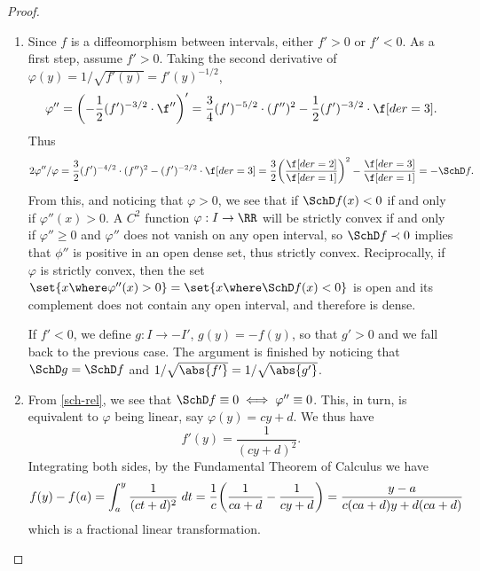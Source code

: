 \documentclass[../main]{subfiles}
\begin{document}
\begin{proof}
\begin{enumerate}
    \begin{equation*}
      0 = \SchD{\Id} = (\SchD f^{-1}) \circ f \cdot (f')^2 + \SchD f,
    \end{equation*}
    and by the same argument of the paragraph above, we conclude \(\SchD f \prec 0 \iff \SchD f^{-1} \succ 0\).
    \item Since \(f\) is a diffeomorphism between intervals, either \(f' > 0\) or \(f' < 0\). As a first step, assume \(f' > 0\). Taking the second derivative of \(\varphi(y) = 1/ \sqrt{f'(y)} = f'(y)^{-1/2}\),
    \begin{equation*}
      \varphi'' = \rpar*{-\frac{1}{2}\rpar{f'}^{-3/2}\cdot{\f''}}' =
      \frac{3}{4}(f')^{-5/2}\cdot (f'')^2 - \frac{1}{2}(f')^{-3/2}\cdot \f[der = 3].
    \end{equation*}
    Thus
    \begin{equation}
      2{\varphi''}/{\varphi} = 
      \frac{3}{2}(f')^{-4/2}\cdot (f'')^2 - (f')^{-2/2}\cdot \f[der = 3] =\frac{3}{2}\rpar*{\frac{\f[der = 2]}{\f[der = 1]}}^2 - \frac{\f[der = 3]}{\f[der = 1]}  = - \SchD f.\label{sch-rel}
    \end{equation}
    From this, and noticing that \(\varphi > 0\), we see that if \(\SchD f(x) < 0\) if and only if \(\varphi''(x) > 0\). A \(C^2\) function \(\varphi : I \to \RR\) will be strictly convex if and only if  \(\varphi'' \ge 0\) and \(\varphi''\) does not vanish on any open interval,
    so \(\SchD f \prec 0\) implies that \(\phi''\) is positive in an open dense set, thus strictly convex. Reciprocally, if \(\varphi\) is strictly convex, then the set \(\set{x \where \varphi''(x) > 0} = \set{x \where \SchD f(x) < 0}\) is open and its complement does not contain any open interval, and therefore is dense.

    If \(f' < 0\), we define \(g \colon I \to - I'\), \(g(y) = - f(y)\), so that \(g' > 0\) and we fall back to the previous case. The argument is finished by noticing that \(\SchD g =  \SchD f\) and \(1/ \sqrt{\abs{f'}} = 1/\sqrt{\abs{g'}}\).
  \item From \cref{sch-rel}, we see that \(\SchD f \equiv 0 \iff \varphi'' \equiv 0\). This, in turn, is equivalent to \(\varphi\) being linear, say \(\varphi(y) = cy + d\). We thus have
    \begin{equation*}
      f'(y) = \frac{1}{(cy + d)^2}.
    \end{equation*}
    Integrating both sides, by the Fundamental Theorem of Calculus we have
    \begin{equation*}
      f(y) - f(a) = \int_a^y \frac{1}{(ct + d)^2} \;dt = \frac{1}{c}\rpar*{\frac{1}{ca + d} - \frac{1}{cy + d}} = \frac{y - a}{c(ca + d)y + d(ca + d)}
    \end{equation*}
    which is a fractional linear transformation.
  \end{enumerate}
\end{proof}
\end{document}
